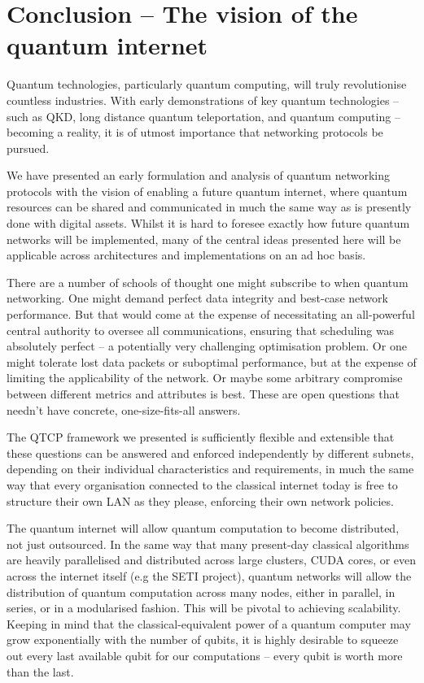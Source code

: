 \documentclass[aps, rmp, twocolumn, amsmath, amssymb, nofootinbib, superscriptaddress, longbibliography, floatfix, table-of-contents, eqsecnum]{revtex4-1}
\begin{document}
\section{Conclusion -- The vision of the quantum internet} \label{sec:vision_quant} 

Quantum technologies, particularly quantum computing, will truly revolutionise countless industries. With early demonstrations of key quantum technologies -- such as QKD, long distance quantum teleportation, and quantum computing -- becoming a reality, it is of utmost importance that networking protocols be pursued.

We have presented an early formulation and analysis of quantum networking protocols with the vision of enabling a future quantum internet, where quantum resources can be shared and communicated in much the same way as is presently done with digital assets. Whilst it is hard to foresee exactly how future quantum networks will be implemented, many of the central ideas presented here will be applicable across architectures and implementations on an ad hoc basis.

There are a number of schools of thought one might subscribe to when quantum networking. One might demand perfect data integrity and best-case network performance. But that would come at the expense of necessitating an all-powerful central authority to oversee all communications, ensuring that scheduling was absolutely perfect -- a potentially very challenging optimisation problem. Or one might tolerate lost data packets or suboptimal performance, but at the expense of limiting the applicability of the network. Or maybe some arbitrary compromise between different metrics and attributes is best. These are open questions that needn't have concrete, one-size-fits-all answers.

The QTCP framework we presented is sufficiently flexible and extensible that these questions can be answered and enforced independently by different subnets, depending on their individual characteristics and requirements, in much the same way that every organisation connected to the classical internet today is free to structure their own LAN as they please, enforcing their own network policies.

The quantum internet will allow quantum computation to become distributed, not just outsourced. In the same way that many present-day classical algorithms are heavily parallelised and distributed across large clusters, CUDA cores, or even across the internet itself (e.g the SETI project), quantum networks will allow the distribution of quantum computation across many nodes, either in parallel, in series, or in a modularised fashion. This will be pivotal to achieving scalability. Keeping in mind that the classical-equivalent power of a quantum computer may grow exponentially with the number of qubits, it is highly desirable to squeeze out every last available qubit for our computations -- every qubit is worth more than the last.
\end{document}
